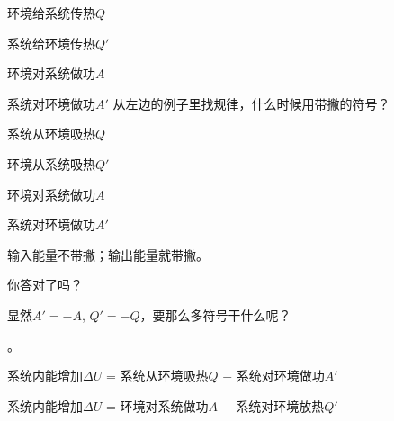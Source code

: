 \documentclass[CJK]{beamer}
\begin{document}
\begin{frame}
\bch

\bitem
\item{环境给系统传热$Q$}
\item{系统给环境传热$Q'$}
\item{环境对系统做功$A$}
\item{系统对环境做功$A'$}
\eitem
\emini
{}
从左边的例子里找规律，什么时候用带撇的符号？
\emini
\ech
\end{frame}

\begin{frame}
\bch

\bitem
\item{系统从环境吸热$Q$}
\item{环境从系统吸热$Q'$}
\item{环境对系统做功$A$}
\item{系统对环境做功$A'$}
\eitem
\emini
{}

输入能量不带撇；输出能量就带撇。

\huaixiao 你答对了吗？


\emini
\ech
\end{frame}

\begin{frame}
\bch

显然$A'=-A$, $Q'=-Q$，要那么多符号干什么呢？

\skiplines

。

\ech
\end{frame}

\begin{frame}
\bch
{}
\ech
\end{frame}


\begin{frame}
\bch
\tbox
{\small 系统内能增加$\Delta U$ = 系统从环境吸热$Q$ $-$  系统对环境做功$A'$}

\ech
\end{frame}


\begin{frame}
\bch
\tbox
{\small 系统内能增加$\Delta U$ = 环境对系统做功$A$ $-$ 系统对环境放热$Q'$}

\ech
\end{frame}
\end{document}
